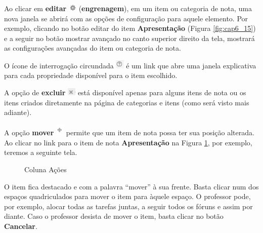 Ao clicar em \textbf{editar} \includegraphics[width=0.03\textwidth]{imagem/cap5/fig7.jpg} (\textbf{engrenagem}), em um item ou categoria de nota, uma nova janela se abrirá com as opções de configuração para aquele elemento. Por exemplo, clicando no botão editar do item \textbf{Apresentação} (Figura \ref{fig:cap6_15}) e a seguir no botão mostrar avançado no canto superior direito da tela, mostrará as configurações avançadas do item ou categoria de nota.

O ícone de interrogação circundada \includegraphics[width=0.03\textwidth]{imagem/cap6/fig17.jpg} é um link que abre uma janela explicativa para cada propriedade disponível para o item escolhido.

A opção de \textbf{excluir}  \includegraphics[width=0.03\textwidth]{imagem/cap6/fig18.jpg} está disponível apenas para alguns itens de nota ou os itens criados diretamente na página de categorias e itens (como será visto mais adiante).

A opção \textbf{mover} \includegraphics[width=0.03\textwidth]{imagem/cap6/fig19.jpg}  permite que um item de nota possa ter sua posição alterada. Ao clicar no link para o item de nota \textbf{Apresentação} na Figura \ref{fig:cap6_16}, por exemplo, teremos a seguinte tela.

\begin{figure}[htbp]
 \begin{center}
  \caption{Coluna Ações}
  \label{fig:cap6_16}
 \end{center}
\end{figure}
O item fica destacado e com a palavra “mover” à sua frente. Basta clicar num dos espaços quadriculados para mover o item para àquele espaço. O professor pode, por exemplo, alocar todas as tarefas juntas, a seguir todos os fóruns e assim por diante. Caso o professor desista de mover o item, basta clicar no botão \textbf{Cancelar}.


